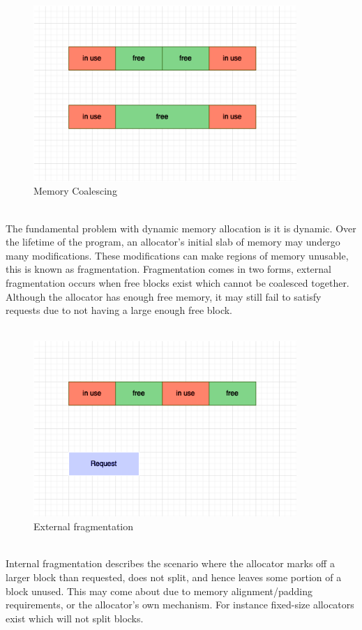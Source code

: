 \documentclass{article}
\begin{document}
\\
\begin{figure}[h]
	\centering
	\includegraphics[width=10cm]{coalesce}
	\captionsetup{width=10cm}
	\caption{Memory Coalescing}
\end{figure}
\\
The fundamental problem with dynamic memory allocation is it is dynamic. Over the lifetime of the program, an allocator's initial slab of memory may undergo many modifications. These modifications can make regions of memory unusable, this is known as fragmentation. Fragmentation comes in two forms, external fragmentation occurs when free blocks exist which cannot be coalesced together. Although the allocator has enough free memory, it may still fail to satisfy requests due to not having a large enough free block.\\
\\
\begin{figure}[h]
	\centering
	\includegraphics[width=10cm]{external_fragmentation}
	\captionsetup{width=10cm}
	\caption{External fragmentation}
\end{figure}
\\
Internal fragmentation describes the scenario where the allocator marks off a larger block than requested, does not split, and hence leaves some portion of a block unused. This may come about due to memory alignment/padding requirements, or the allocator's own mechanism. For instance fixed-size allocators exist which will not split blocks.\\
\end{document}

